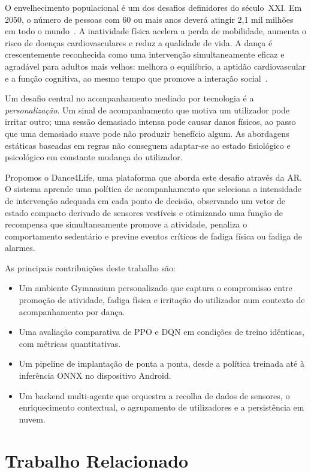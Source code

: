 \documentclass[runningheads]{llncs}
\begin{document}
O envelhecimento populacional é um dos desafios definidores do século~XXI.
Em 2050, o número de pessoas com 60 ou mais anos deverá atingir 2,1 mil milhões
em todo o mundo~\cite{who2022}. A inatividade física acelera a perda de mobilidade,
aumenta o risco de doenças cardiovasculares e reduz a qualidade de vida.
A dança é crescentemente reconhecida como uma intervenção simultaneamente eficaz e
agradável para adultos mais velhos: melhora o equilíbrio, a aptidão cardiovascular
e a função cognitiva, ao mesmo tempo que promove a interação
social~\cite{hwang2016}.

Um desafio central no acompanhamento mediado por tecnologia é a
\emph{personalização}. Um sinal de acompanhamento que motiva um utilizador pode
irritar outro; uma sessão demasiado intensa pode causar danos físicos, ao passo
que uma demasiado suave pode não produzir benefício algum. As abordagens estáticas
baseadas em regras não conseguem adaptar-se ao estado fisiológico e psicológico em
constante mudança do utilizador.

Propomos o Dance4Life, uma plataforma que aborda este desafio através da AR.
O sistema aprende uma política de acompanhamento que seleciona a intensidade de
intervenção adequada em cada ponto de decisão, observando um vetor de estado
compacto derivado de sensores vestíveis e otimizando uma função de recompensa que
simultaneamente promove a atividade, penaliza o comportamento sedentário e previne
eventos críticos de fadiga física ou fadiga de alarmes.

As principais contribuições deste trabalho são:
\begin{itemize}
  \item Um ambiente Gymnasium personalizado que captura o compromisso entre
        promoção de atividade, fadiga física e irritação do utilizador num
        contexto de acompanhamento por dança.
  \item Uma avaliação comparativa de PPO e DQN em condições de treino idênticas,
        com métricas quantitativas.
  \item Um pipeline de implantação de ponta a ponta, desde a política treinada até
        à inferência ONNX no dispositivo Android.
  \item Um backend multi-agente que orquestra a recolha de dados de sensores,
        o enriquecimento contextual, o agrupamento de utilizadores e a
        persistência em nuvem.
\end{itemize}

%
\section{Trabalho Relacionado}
\label{sec:related}
\end{document}
